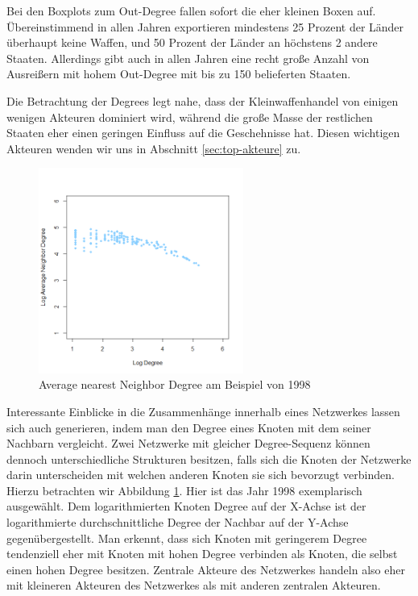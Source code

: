\documentclass[a4paper,ngerman,oneside,titlepage,bibliography=totoc,11pt]{scrreprt}
\begin{document}
Bei den Boxplots zum Out-Degree fallen sofort die eher kleinen Boxen auf. Übereinstimmend in allen Jahren exportieren mindestens 25 Prozent der Länder überhaupt keine Waffen, und 50 Prozent der Länder an höchstens 2 andere Staaten. Allerdings gibt auch in allen Jahren eine recht große Anzahl von Ausreißern mit hohem Out-Degree mit bis zu 150 belieferten Staaten. 

Die Betrachtung der Degrees legt nahe, dass der Kleinwaffenhandel von einigen wenigen Akteuren dominiert wird, während die große Masse der restlichen Staaten eher einen geringen Einfluss auf die Geschehnisse hat. Diesen wichtigen Akteuren wenden wir uns in Abschnitt \ref{sec:top-akteure} zu.


\begin{figure}[htbp]
	\centering
		\includegraphics[width=0.60\textwidth]{Grafiken/and.png}
	\caption{Average nearest Neighbor Degree am Beispiel von 1998}
	\label{fig:and}
\end{figure}

Interessante Einblicke in die Zusammenhänge innerhalb eines Netzwerkes lassen sich auch generieren, indem man den Degree eines Knoten mit dem seiner Nachbarn vergleicht. Zwei Netzwerke mit gleicher Degree-Sequenz können dennoch unterschiedliche Strukturen besitzen, falls sich die Knoten der Netzwerke darin unterscheiden mit welchen anderen Knoten sie sich bevorzugt verbinden. Hierzu betrachten wir Abbildung \ref{fig:and}. Hier ist das Jahr 1998 exemplarisch ausgewählt. Dem logarithmierten Knoten Degree auf der X-Achse ist der logarithmierte durchschnittliche Degree der Nachbar auf der Y-Achse gegenübergestellt. Man erkennt, dass sich Knoten mit geringerem Degree tendenziell eher mit Knoten mit hohen Degree verbinden als Knoten, die selbst einen hohen Degree besitzen. Zentrale Akteure des Netzwerkes handeln also eher mit kleineren Akteuren des Netzwerkes als mit anderen zentralen Akteuren.
\end{document}
